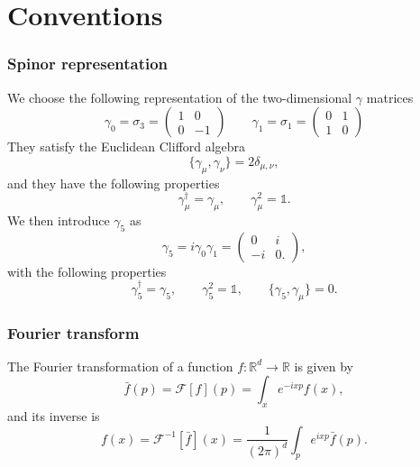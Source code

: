  
\chapter{Conventions} %
\label{chap:AppendixA} %
\subsection*{Spinor representation}
We choose the following representation of the two-dimensional $\gamma$ matrices
\begin{equation*}
        \gamma_0 = \sigma_3 = 
        \begin{pmatrix}
            1 & 0 \\
            0 & -1    
        \end{pmatrix}
        \qquad 
        \gamma_1 = \sigma_1 = 
        \begin{pmatrix}
            0 & 1 \\
            1 & 0    
        \end{pmatrix}
\end{equation*}
They satisfy the Euclidean Clifford algebra
\begin{equation*}
    \{\gamma_\mu, \gamma_\nu\} = 2\delta_{\mu, \nu},
\end{equation*}
and they have the following properties
\begin{equation*}
    \gamma_\mu^{\dagger}=\gamma_\mu, \quad  \quad \gamma_\mu^2=\mathbb{1}.
\end{equation*}
We then introduce $\gamma_5$ as
\begin{equation*}
    \gamma_5 = i \gamma_0 \gamma_1 =
    \begin{pmatrix}
        0 & i \\
        -i & 0. 
    \end{pmatrix},
\end{equation*}
with the following properties
\begin{equation*} 
    \gamma_5^{\dagger}=\gamma_5, \qquad \gamma_5^2=\mathbb{1}, \qquad \{\gamma_5, \gamma_\mu\} = 0.
\end{equation*}



\subsection*{Fourier transform}
The Fourier transformation of a function $f: \mathbb{R}^d \rightarrow \mathbb{R}$ is given by
\begin{equation*}
\bar{f}(p)=\mathcal{F}[f](p)=\int_x e^{-ixp} f(x),
\end{equation*}
and its inverse is
\begin{equation*}
f(x)=\mathcal{F}^{-1}[\bar{f}](x)=\frac{1}{(2 \pi)^d} \int_p e^{ixp} \bar{f}(p).
\end{equation*}
